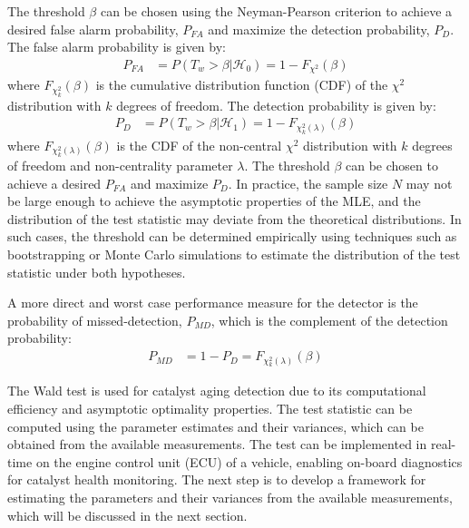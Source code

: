The threshold $\beta$ can be chosen using the Neyman-Pearson criterion \cite{kay1998detection} to achieve a desired false alarm probability, $P_{FA}$ and maximize the detection probability, $P_D$. The false alarm probability is given by:
\begin{align}
        P_{FA} &= P(T_w > \beta | \mathcal{H}_0) = 1 - F_{\chi^2}(\beta)
\end{align}
where $F_{\chi^2_k}(\beta)$ is the cumulative distribution function (CDF) of the $\chi^2$ distribution with $k$ degrees of freedom. The detection probability is given by:
\begin{align}
        P_D &= P(T_w > \beta | \mathcal{H}_1) = 1 - F_{\chi^2_k (\lambda)}(\beta)
\end{align}
where $F_{\chi^2_k (\lambda)}(\beta)$ is the CDF of the non-central $\chi^2$ distribution with $k$ degrees of freedom and non-centrality parameter $\lambda$. The threshold $\beta$ can be chosen to achieve a desired $P_{FA}$ and maximize $P_D$. In practice, the sample size $N$ may not be large enough to achieve the asymptotic properties of the MLE, and the distribution of the test statistic may deviate from the theoretical distributions. In such cases, the threshold can be determined empirically using techniques such as bootstrapping or Monte Carlo simulations to estimate the distribution of the test statistic under both hypotheses.

A more direct and worst case performance measure for the detector is the probability of missed-detection, $P_{MD}$, which is the complement of the detection probability:
\begin{align}
        P_{MD} &= 1 - P_D = F_{\chi^2_k (\lambda)}(\beta)
\end{align}

The Wald test is used for catalyst aging detection due to its computational efficiency and asymptotic optimality properties. The test statistic can be computed using the parameter estimates and their variances, which can be obtained from the available measurements. The test can be implemented in real-time on the engine control unit (ECU) of a vehicle, enabling on-board diagnostics for catalyst health monitoring. The next step is to develop a framework for estimating the parameters and their variances from the available measurements, which will be discussed in the next section.
